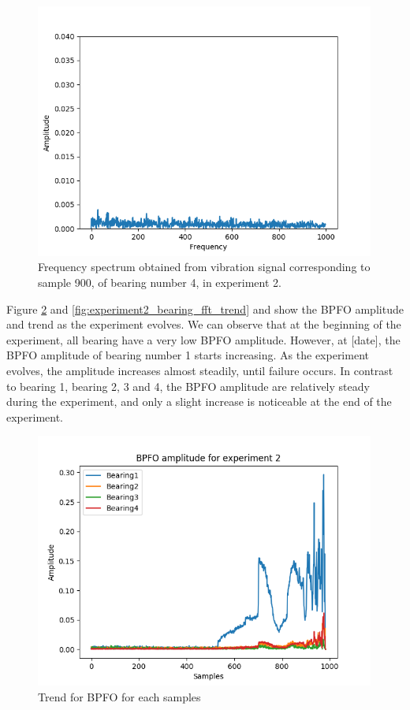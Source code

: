 \documentclass[../Main/thesis.tex]{subfiles}
\begin{document}
\begin{figure}[H] 
   \centering
   \includegraphics[width=4.4in]{../fig/experiment2_bearing4_fft.png} 
   \caption{Frequency spectrum obtained from vibration signal corresponding to sample 900, of bearing number 4, in experiment 2.}
   \label{fig:bearing4-experiment2-fft}
\end{figure}
\justify
Figure \ref{fig:experiment2_bearing_fft_amp}  and \ref{fig:experiment2_bearing_fft_trend}  and show the BPFO amplitude and
 trend as the experiment evolves. We can observe that at the beginning of the experiment, all bearing have a very low BPFO amplitude. However, at [date], the BPFO amplitude of bearing number 1 starts increasing. As the experiment evolves, the amplitude increases almost steadily, until failure occurs. In contrast to bearing 1, bearing 2, 3 and 4, the BPFO amplitude are relatively steady during the experiment, and only a slight increase is noticeable at the end of the experiment.
\begin{figure}[H] 
   \centering
    \includegraphics[width=4.4in]{../fig/experiment2_bearing_fft_amp.png}
   \caption{Trend for BPFO for each samples}
   \label{fig:experiment2_bearing_fft_amp}
\end{figure}
\end{document}
